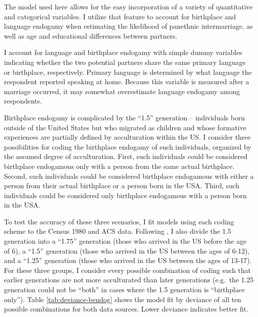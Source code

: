 \documentclass[11pt,]{article}
\begin{document}
The model used here allows for the easy incorporation of a variety of quantitative and categorical variables. I utilize that feature to account for birthplace and language endogamy when estimating the likelihood of panethnic intermarriage, as well as age and educational differences between partners.

I account for language and birthplace endogamy with simple dummy variables indicating whether the two potential partners share the same primary language or birthplace, respectively. Primary language is determined by what language the respondent reported speaking at home. Because this variable is measured after a marriage occurred, it may somewhat overestimate language endogamy among respondents.

Birthplace endogamy is complicated by the ``1.5'' generation -- individuals born outside of the United States but who migrated as children and whose formative experiences are partially defined by acculturation within the US. I consider three possibilities for coding the birthplace endogamy of such individuals, organized by the assumed degree of acculturation. First, such individuals could be considered birthplace endogamous only with a person from the same actual birthplace. Second, such individuals could be considered birthplace endogamous with either a person from their actual birthplace or a person born in the USA. Third, such individuals could be considered only birthplace endogamous with a person born in the USA.

To test the accuracy of these three scenarios, I fit models using each coding scheme to the Census 1980 and ACS data. Following \citet{rumbaut_ages_2004a}, I also divide the 1.5 generation into a ``1.75'' generation (those who arrived in the US before the age of 6), a ``1.5'' generation (those who arrived in the US between the ages of 6-12), and a ``1.25'' generation (those who arrived in the US between the ages of 13-17). For these three groups, I consider every possible combination of coding such that earlier generations are not more acculturated than later generations (e.g.~the 1.25 generation could not be ``both'' in cases where the 1.5 generation is ``birthplace only''). Table \ref{tab:deviance-bendog} shows the model fit by deviance of all ten possible combinations for both data sources. Lower deviance indicates better fit.
\end{document}
